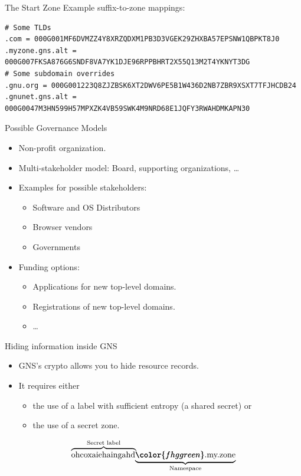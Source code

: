 \documentclass[aspectratio=169]{beamer}
\begin{document}
\begin{frame}[fragile]{The Start Zone}
  Example suffix-to-zone mappings:
  \begin{small}
  \begin{verbatim}
# Some TLDs
.com = 000G001MF6DVMZZ4Y8XRZQDXM1PB3D3VGEK29ZHXBA57EPSNW1QBPKT8J0
.myzone.gns.alt = 000G007FKSA876G6SNDF8VA7YK1DJE96RPPBHRT2X55Q13M2T4YKNYT3DG
# Some subdomain overrides
.gnu.org = 000G001223Q8ZJZBSK6XT2DWV6PE5B1W436D2NB7ZBR9XSXT7TFJHCDB24
.gnunet.gns.alt = 000G0047M3HN599H57MPXZK4VB59SWK4M9NRD68E1JQFY3RWAHDMKAPN30
  \end{verbatim}
  \end{small}
\end{frame}


\begin{frame}{Possible Governance Models}
  \begin{itemize}
    \item Non-profit organization.
    \item Multi-stakeholder model: Board, supporting organizations, \ldots
    \item Examples for possible stakeholders:
      \begin{itemize}
        \item Software and OS Distributors
        \item Browser vendors
        \item Governments
      \end{itemize}
    \item Funding options:
      \begin{itemize}
        \item Applications for new top-level domains.
        \item Registrations of new top-level domains.
        \item \ldots
      \end{itemize}
  \end{itemize}
\end{frame}

\begin{frame}{Hiding information inside GNS}
  \begin{itemize}
    \item GNS's crypto allows you to hide resource records.
    \item It requires either
      \begin{itemize}
        \item the use of a label with sufficient entropy (a shared secret) or
        \item the use of a secret zone.
      \end{itemize}
  \end{itemize}
  $$
    \mathrlap{\overbrace{\phantom{\text{ohcoxaiShaingahd}}}^{\text{Secret label}}}
    \text{ohcoxaiehaingahd}
    \mathrlap{\underbrace{{\color{fhggreen}\phantom{\text{.my.zone}}}}_{\text{Namespace}}}
    {\color{fhggreen}\text{.my.zone}}
  $$
\end{frame}
\end{document}
